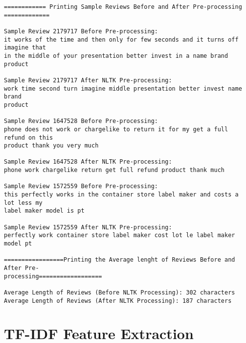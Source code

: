 \documentclass[11pt]{article}
\begin{document}
    \begin{Verbatim}[commandchars=\\\{\}]
============ Printing Sample Reviews Before and After Pre-processing
=============

Sample Review 2179717 Before Pre-processing:
it works of the time and then only for few seconds and it turns off imagine that
in the middle of your presentation better invest in a name brand product

Sample Review 2179717 After NLTK Pre-processing:
work time second turn imagine middle presentation better invest name brand
product

Sample Review 1647528 Before Pre-processing:
phone does not work or chargelike to return it for my get a full refund on this
product thank you very much

Sample Review 1647528 After NLTK Pre-processing:
phone work chargelike return get full refund product thank much

Sample Review 1572559 Before Pre-processing:
this perfectly works in the container store label maker and costs a lot less my
label maker model is pt

Sample Review 1572559 After NLTK Pre-processing:
perfectly work container store label maker cost lot le label maker model pt

=================Printing the Average lenght of Reviews Before and After Pre-
processing==================

Average Length of Reviews (Before NLTK Processing): 302 characters
Average Length of Reviews (After NLTK Processing): 187 characters
    \end{Verbatim}

    \section{TF-IDF Feature Extraction}\label{tf-idf-feature-extraction}
\end{document}
